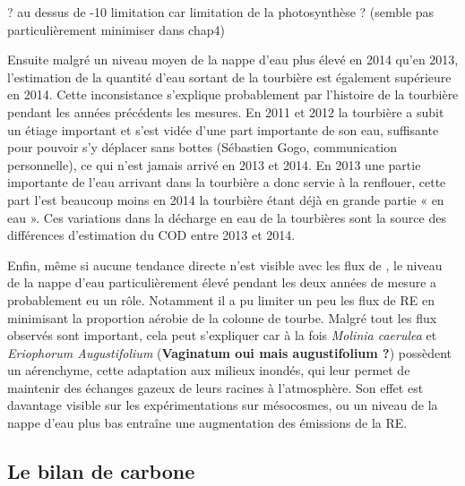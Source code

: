 ? au dessus de -10 limitation car limitation de la photosynthèse ? (semble pas particulièrement minimiser dans chap4)

Ensuite malgré un niveau moyen de la nappe d'eau plus élevé en 2014 qu'en 2013, l'estimation de la quantité d'eau sortant de la tourbière est également supérieure en 2014.
Cette inconsistance s'explique probablement par l'histoire de la tourbière pendant les années précédents les mesures.
En 2011 et 2012 la tourbière a subit un étiage important et s'est vidée d'une part importante de son eau, suffisante pour pouvoir s'y déplacer sans bottes (Sébastien Gogo, communication personnelle), ce qui n'est jamais arrivé en 2013 et 2014.
En 2013 une partie importante de l'eau arrivant dans la tourbière a donc servie à la renflouer, cette part l'est beaucoup moins en 2014 la tourbière étant déjà en grande partie « en eau ».
Ces variations dans la décharge en eau de la tourbières sont la source des différences d'estimation du COD entre 2013 et 2014.

Enfin, même si aucune tendance directe n'est visible avec les flux de \coo, le niveau de la nappe d'eau particulièrement élevé pendant les deux années de mesure a probablement eu un rôle.
Notamment il a pu limiter un peu les flux de RE en minimisant la proportion aérobie de la colonne de tourbe.
Malgré tout les flux observés sont important, cela peut s'expliquer car à la fois \textit{Molinia caerulea} et \textit{Eriophorum Augustifolium} (\textbf{Vaginatum oui mais augustifolium ?}) possèdent un aérenchyme, cette adaptation aux milieux inondés, qui leur permet de maintenir des échanges gazeux de leurs racines à l'atmosphère.
Son effet est davantage visible sur les expérimentations sur mésocosmes, ou un niveau de la nappe d'eau plus bas entraîne une augmentation des émissions de la RE.


\subsection*{Le bilan de carbone}


